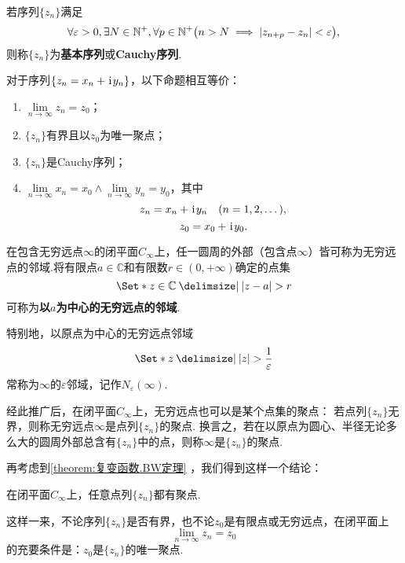 \begin{definition}
若序列\(\{z_n\}\)满足\[
\forall \varepsilon > 0, \exists N \in \mathbb{N}^+, \forall p\in\mathbb{N}^+ \bigl(
n > N  \implies  \abs{z_{n+p} - z_n} < \varepsilon
\bigr),
\]则称\(\{z_n\}\)为\textbf{基本序列}或\textbf{Cauchy序列}.
\end{definition}

\begin{theorem}
对于序列\(\{z_n = x_n + \kern1pt\mathrm{i}\kern1pt y_n\}\)，以下命题相互等价：
\begin{enumerate}
\item \(\lim\limits_{n \to \infty} z_n = z_0\)；

\item \(\{z_n\}\)有界且以\(z_0\)为唯一聚点；

\item \(\{z_n\}\)是Cauchy序列；

\item \(\lim\limits_{n \to \infty} x_n = x_0 \land \lim\limits_{n \to \infty} y_n = y_0\)，其中\[
z_n = x_n + \kern1pt\mathrm{i}\kern1pt y_n \quad(n = 1,2,\dotsc),
\]\[
z_0 = x_0 + \kern1pt\mathrm{i}\kern1pt y_0.
\]
\end{enumerate}
\end{theorem}

\begin{definition}
在包含无穷远点\(\infty\)的闭平面\(C_{\infty}\)上，任一圆周的外部（包含点\(\infty\)）皆可称为无穷远点的邻域.将有限点\(a\in\mathbb{C}\)和有限数\(r\in(0,+\infty)\)确定的点集\[
\Set*{ z\in\mathbb{C} \given \abs{z-a}>r }
\]可称为\textbf{以\(a\)为中心的无穷远点的邻域}.

特别地，以原点为中心的无穷远点邻域\[
\Set*{ z \given \abs{z} > \frac{1}{\varepsilon} }
\]常称为\(\infty\)的\(\varepsilon\)邻域，记作\(N_{\varepsilon}(\infty)\).
\end{definition}
经此推广后，在闭平面\(C_{\infty}\)上，无穷远点也可以是某个点集的聚点：
若点列\(\{z_n\}\)无界，则称无穷远点\(\infty\)是点列\(\{z_n\}\)的聚点.
换言之，若在以原点为圆心、半径无论多么大的圆周外部总含有\(\{z_n\}\)中的点，则称\(\infty\)是\(\{z_n\}\)的聚点.

再考虑到\cref{theorem:复变函数.BW定理} ，我们得到这样一个结论：
\begin{theorem}
在闭平面\(C_{\infty}\)上，任意点列\(\{z_n\}\)都有聚点.
\end{theorem}
这样一来，不论序列\(\{z_n\}\)是否有界，也不论\(z_0\)是有限点或无穷远点，在闭平面上\[
\lim\limits_{n\to\infty} z_n = z_0
\]的充要条件是：\(z_0\)是\(\{z_n\}\)的唯一聚点.

